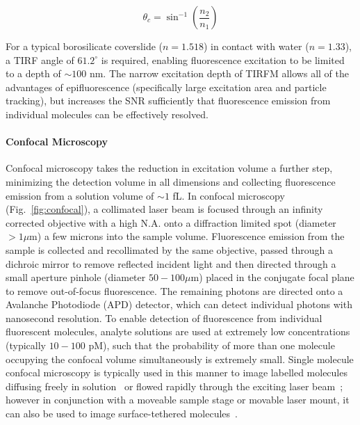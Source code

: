 \begin{equation}
\theta_c = \sin^{-1}\left(\frac{n_2}{n_1}\right)
\label{eq:snell}
\end{equation}

For a typical borosilicate coverslide ($n = 1.518$) in contact with water ($n = 1.33$), a TIRF angle of $61.2^{\circ}$ is required, enabling fluorescence excitation to be limited to a depth of $\sim 100$ nm. The narrow excitation depth of TIRFM allows all of the advantages of epifluorescence (specifically large excitation area and particle tracking), but increases the SNR sufficiently that fluorescence emission from individual molecules can be effectively resolved.

\paragraph{Confocal Microscopy}
Confocal microscopy takes the reduction in excitation volume a further step, minimizing the detection volume in all dimensions and collecting fluorescence emission from a solution volume of $\sim 1$ fL. In confocal microscopy (Fig.~\ref{fig:confocal}), a collimated laser beam is focused through an infinity corrected objective with a high N.A. onto a diffraction limited spot (diameter $> 1 \mu$m) a few microns into the sample volume. Fluorescence emission from the sample is collected and recollimated by the same objective, passed through a dichroic mirror to remove reflected incident light and then directed through a small aperture pinhole (diameter $50 - 100 \mu$m) placed in the conjugate focal plane to remove out-of-focus fluorescence. The remaining photons are directed onto a Avalanche Photodiode (APD) detector, which can detect individual photons with nanosecond resolution. To enable detection of fluorescence from individual fluorescent molecules, analyte solutions are used at extremely low concentrations (typically $10 - 100$ pM), such that the probability of more than one molecule occupying the confocal volume simultaneously is extremely small. Single molecule confocal microscopy is typically used in this manner to image labelled molecules diffusing freely in solution~\cite{weiss00} or flowed rapidly through the exciting laser beam~\cite{horrocks2012}; however in conjunction with a moveable sample stage or movable laser mount, it can also be used to image surface-tethered molecules~\cite{???}. 


